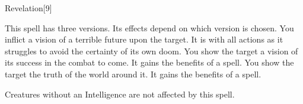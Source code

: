 \begin{spellsection}{Revelation}[9]
    \begin{spellheader}
    \end{spellheader}
    \begin{spellcontent}
        \begin{spelltargetinginfo}
        \end{spelltargetinginfo}
        \begin{spelleffects}
            \spellspecial This spell has three versions. Its effects depend on which version is chosen.
             You inflict a vision of a terrible future upon the target. It is \severelyimpaired with all actions as it struggles to avoid the certainty of its own doom.
             You show the target a vision of its success in the combat to come. It gains the benefits of a  spell.
             You show the target the truth of the world around it. It gains the benefits of a  spell.
            \spelldur \durshort
        \end{spelleffects}
    \end{spellcontent}
    \begin{spellfooter}
        \spellnotes Creatures without an Intelligence are not affected by this spell.
        \miscastrandom
    \end{spellfooter}
\end{spellsection}

